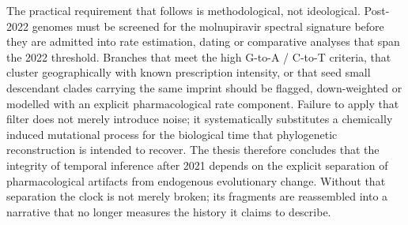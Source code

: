 The practical requirement that follows is methodological, not ideological. Post-2022 genomes must be screened for the molnupiravir spectral signature before they are admitted into rate estimation, dating or comparative analyses that span the 2022 threshold. Branches that meet the high G-to-A / C-to-T criteria, that cluster geographically with known prescription intensity, or that seed small descendant clades carrying the same imprint should be flagged, down-weighted or modelled with an explicit pharmacological rate component. Failure to apply that filter does not merely introduce noise; it systematically substitutes a chemically induced mutational process for the biological time that phylogenetic reconstruction is intended to recover. The thesis therefore concludes that the integrity of temporal inference after 2021 depends on the explicit separation of pharmacological artifacts from endogenous evolutionary change. Without that separation the clock is not merely broken; its fragments are reassembled into a narrative that no longer measures the history it claims to describe.
